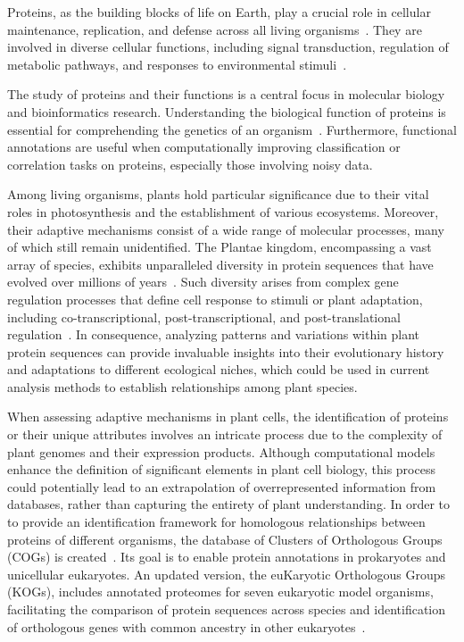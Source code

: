 Proteins, as the building blocks of life on Earth, play a 
crucial role in cellular maintenance, replication, and defense 
across all living organisms~\citep{kaur2022}. They are involved 
in diverse cellular functions, including signal transduction, 
regulation of metabolic pathways, and responses to environmental 
stimuli~\citep{zhang2010}.

The study of proteins and their functions is a central focus in 
molecular biology and bioinformatics research. Understanding the 
biological function of proteins is essential for comprehending 
the genetics of an organism~\citep{silva2020}. Furthermore, 
functional annotations are useful when computationally improving 
classification or correlation tasks on proteins, especially those 
involving noisy data. 

Among living 
organisms, plants hold particular significance due to their 
vital roles in photosynthesis and the establishment of various 
ecosystems. Moreover, their adaptive mechanisms consist of a 
wide range of molecular processes, many of which still remain 
unidentified. The Plantae kingdom, encompassing a vast array of 
species, exhibits unparalleled diversity in protein sequences 
that have evolved over millions of years~\citep{chaudhary2019}. 
Such diversity arises from complex gene regulation processes 
that define cell response to stimuli or plant adaptation, 
including co-transcriptional, post-transcriptional, and 
post-translational regulation~\citep{skelly2016}. In 
consequence, analyzing 
patterns and variations within plant protein sequences can 
provide invaluable insights into their evolutionary history 
and adaptations to different ecological niches, which could be 
used in current analysis methods to establish 
relationships among plant species.

When assessing adaptive mechanisms in plant cells, the 
identification of proteins or their unique attributes
involves an intricate process due to the complexity of plant 
genomes and their expression products. Although 
computational models enhance the definition of significant elements 
in plant cell biology, this process could potentially lead to an 
extrapolation of overrepresented information from databases, rather 
than capturing the entirety of plant understanding. In order to 
to provide an identification framework for homologous relationships 
between proteins of different organisms, the database of 
Clusters of Orthologous Groups (COGs) is
created~\citep{tatusov1997,tatusov2001}. Its goal is to enable 
protein annotations in prokaryotes and unicellular 
eukaryotes. An updated version, 
the euKaryotic Orthologous Groups (KOGs), includes annotated 
proteomes for seven eukaryotic model organisms, facilitating 
the comparison of protein sequences across species and 
identification of orthologous genes with common ancestry in 
other eukaryotes~\citep{tatusov2003,yang2023,wangC2023,wangT2023}.

